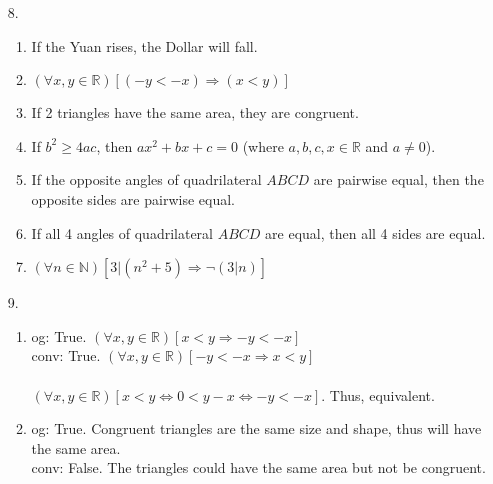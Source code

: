 \documentclass[11pt]{exam}
\begin{document}
\begin{enumerate}[leftmargin=0pt]
\item[8.]
\begin{enumerate}[label=(\alph*)]
    \item If the Yuan rises, the Dollar will fall.
    \item $(\forall x, y \in \mathbb{R}) [(-y < -x) \Rightarrow (x < y)]$
    \item If 2 triangles have the same area, they are congruent.
    \item If $b^2 \geq 4ac$, then $ax^2 + bx + c = 0$ (where $a, b, c, x \in \mathbb{R}$ and $a \neq 0$).
    \item If the opposite angles of quadrilateral $ABCD$ are pairwise equal, then the opposite sides are pairwise equal.
    \item If all 4 angles of quadrilateral $ABCD$ are equal, then all 4 sides are equal.
    \item $(\forall n \in \mathbb{N}) [3 | (n^2 + 5) \Rightarrow \neg (3 | n)]$
\end{enumerate}

\item[9.]
\begin{enumerate}[label=(\alph*), start=2]
    \item og: True. $(\forall x, y \in \mathbb{R})[x < y \Rightarrow -y < -x]$  \\
    conv: True. $(\forall x, y \in \mathbb{R})[-y < -x \Rightarrow x < y]$ \\
    \\
    $(\forall x, y \in \mathbb{R})[x < y \Leftrightarrow 0 < y - x \Leftrightarrow -y < -x ]$. Thus, equivalent.
    \item og: True. Congruent triangles are the same size and shape, thus will have the same area. \\
    conv: False. The triangles could have the same area but not be congruent. \\
    

\end{enumerate}
\end{enumerate}
\end{document}
